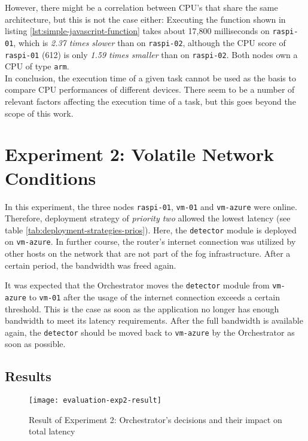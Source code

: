 However, there might be a correlation between CPU's that share the same architecture, but this is not the case either:
Executing the function shown in listing \ref{lst:simple-javascript-function} takes about 17,800 milliseconds on \texttt{raspi-01}, which is \textit{2.37 times slower} than on \texttt{raspi-02}, although the CPU score of \texttt{raspi-01} (612) is only \textit{1.59 times smaller} than on \texttt{raspi-02}. Both nodes own a CPU of type \texttt{arm}.\\

In conclusion, the execution time of a given task cannot be used as the basis to compare CPU performances of different devices.
There seem to be a number of relevant factors affecting the execution time of a task, but this goes beyond the scope of this work.




\section{Experiment 2: Volatile Network Conditions}

In this experiment, the three nodes \texttt{raspi-01}, \texttt{vm-01} and \texttt{vm-azure} were online. Therefore, deployment strategy of \textit{priority two} allowed the lowest latency (see table \ref{tab:deployment-strategies-prios}).
Here, the \texttt{detector} module is deployed on \texttt{vm-azure}.
In further course, the router's internet connection was utilized by other hosts on the network that are not part of the fog infrastructure.
After a certain period, the bandwidth was freed again.


It was expected that the Orchestrator moves the \texttt{detector} module from \texttt{vm-azure} to \texttt{vm-01} after the usage of the internet connection exceeds a certain threshold.
This is the case as soon as the application no longer has enough bandwidth to meet its latency requirements.
After the full bandwidth is available again, the \texttt{detector} should be moved back to \texttt{vm-azure} by the Orchestrator as soon as possible.


\subsection*{Results}

\begin{figure}[htb]
    \centering
    \texttt{[image: evaluation-exp2-result]}
    \caption{Result of Experiment 2: Orchestrator's decisions and their impact on total latency}
    \label{fig:evaluation-exp2-results}
\end{figure}

